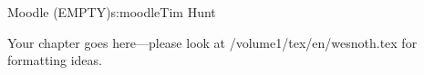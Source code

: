 \begin{aosachapter}{Moodle (EMPTY)}{s:moodle}{Tim Hunt}

Your chapter goes here---please look at /volume1/tex/en/wesnoth.tex for 
formatting ideas.

\end{aosachapter}
